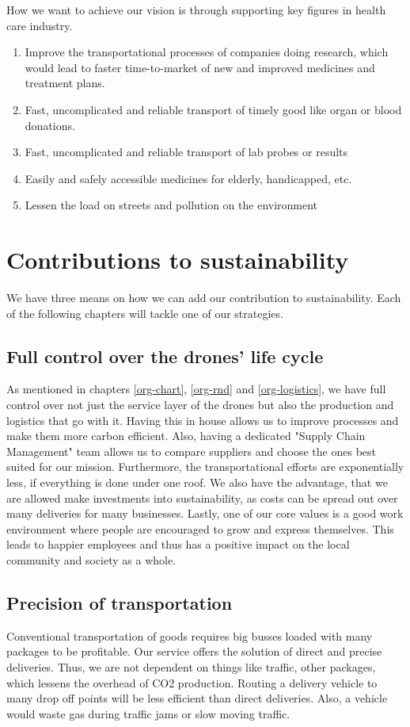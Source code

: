 How we want to achieve our vision is through supporting key figures in health care industry.
\begin{enumerate}
  \item Improve the transportational processes of companies doing research, which would lead to faster time-to-market of new and improved medicines and treatment plans.
  \item Fast, uncomplicated and reliable transport of timely good like organ or blood donations.
  \item Fast, uncomplicated and reliable transport of lab probes or results
  \item Easily and safely accessible medicines for elderly, handicapped, etc.
  \item Lessen the load on streets and pollution on the environment
\end{enumerate}

\section{Contributions to sustainability}
We have three means on how we can add our contribution to sustainability. Each of the following chapters will tackle one of our strategies.
\subsection{Full control over the drones' life cycle}
As mentioned in chapters \ref{org-chart}, \ref{org-rnd} and \ref{org-logistics}, we have full control over not just the service layer of the drones but also the production and logistics that go with it.
\newline
Having this in house allows us to improve processes and make them more carbon efficient. Also, having a dedicated "Supply Chain Management" team allows us to compare suppliers and choose the ones best suited for our mission. Furthermore, the transportational efforts are exponentially less, if everything is done under one roof.
\newline
We also have the advantage, that we are allowed make investments into sustainability, as costs can be spread out over many deliveries for many businesses.
\newline
Lastly, one of our core values is a good work environment where people are encouraged to grow and express themselves. This leads to happier employees and thus has a positive impact on the local community and society as a whole.
\subsection{Precision of transportation}
Conventional transportation of goods requires big busses loaded with many packages to be profitable. Our service offers the solution of direct and precise deliveries. Thus, we are not dependent on things like traffic, other packages, which lessens the overhead of CO2 production. Routing a delivery vehicle to many drop off points will be less efficient than direct deliveries. Also, a vehicle would waste gas during traffic jams or slow moving traffic.

